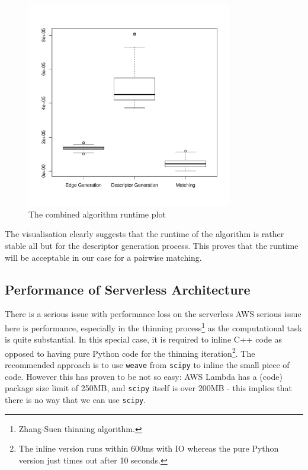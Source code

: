 \begin{figure}[H]
	\centering
	\includegraphics[width=0.8\textwidth]{sketch/all.pdf}
	\caption{The combined algorithm runtime plot}
	\label{fig:algo_visual_all}
\end{figure}

The visualisation clearly suggests that the runtime of the algorithm is rather stable all but for the descriptor generation process. This proves that the runtime will be acceptable in our case for a pairwise matching.

\subsection{Performance of Serverless Architecture}

There is a serious issue with performance loss on the serverless AWS  serious issue here is performance, especially in the thinning process\footnote{Zhang-Suen thinning algorithm.} as the computational task is quite substantial. In this special case, it is required to inline C++ code as opposed to having pure Python code for the thinning iteration\footnote{The inline version runs within 600ms with IO whereas the pure Python version just times out after 10 seconds.}. The recommended approach is to use \texttt{weave} from \texttt{scipy} to inline the small piece of code. However this has proven to be not so easy: AWS Lambda has a (code) package size limit of 250MB, and \texttt{scipy} itself is over 200MB - this implies that there is no way that we can use \texttt{scipy}.

